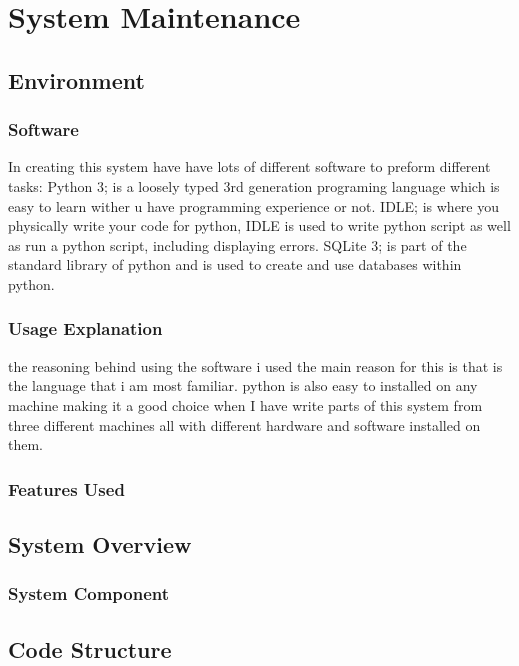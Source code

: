 \chapter{System Maintenance}

\section{Environment}

\subsection{Software}
In creating this system have have lots of different software to preform different tasks: Python 3; is a loosely typed 3rd generation programing language which is easy to learn wither u have programming experience or not. IDLE; is where you physically write your code for python, IDLE is used to write python script as well as run a python script, including displaying errors. SQLite 3; is part of the standard library of python and is used to create and use databases within python.

\subsection{Usage Explanation}
the reasoning behind using the software i used
the main reason for this is that is the language that i am most familiar. python is also easy to installed on any machine making it a good choice when I have write parts of this system from three different machines all with different hardware and software installed on them.

\subsection{Features Used}

\section{System Overview}

\subsection{System Component}

\section{Code Structure}

